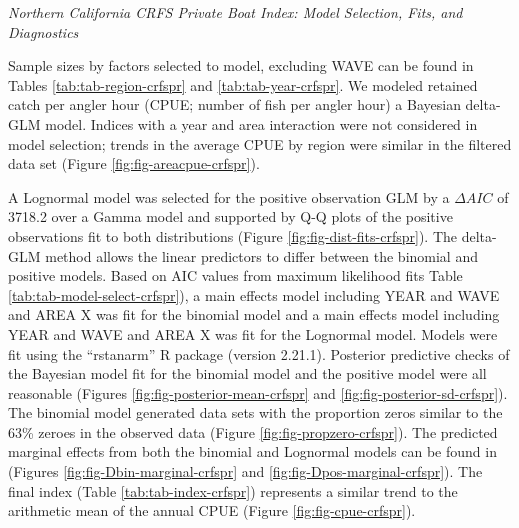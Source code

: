 \documentclass[
  english,
  a4paper,
]{article}
\begin{document}
\emph{Northern California CRFS Private Boat Index: Model Selection, Fits, and Diagnostics}

Sample sizes by factors selected to model, excluding WAVE can be found in Tables
\ref{tab:tab-region-crfspr} and \ref{tab:tab-year-crfspr}.
We modeled retained catch per angler hour (CPUE; number of fish per angler hour)
a Bayesian delta-GLM model. Indices with a year and area interaction were not
considered in model selection; trends in the average CPUE by region were similar
in the filtered data set (Figure \ref{fig:fig-areacpue-crfspr}).

A Lognormal model was
selected for the positive observation GLM by
a \(\Delta AIC\) of 3718.2 over a Gamma model and supported by Q-Q plots of the positive observations fit to both distributions (Figure \ref{fig:fig-dist-fits-crfspr}). The delta-GLM
method allows the linear predictors to differ between the binomial and positive models.
Based on AIC values from maximum likelihood fits Table \ref{tab:tab-model-select-crfspr}),
a main effects model including
YEAR and WAVE and AREA X
was fit for the binomial model and a main
effects model including
YEAR and WAVE and AREA X
was fit for the Lognormal model.
Models were fit using the ``rstanarm'' R package (version 2.21.1). Posterior predictive
checks of the Bayesian model fit for the binomial model and the positive model
were all reasonable (Figures \ref{fig:fig-posterior-mean-crfspr} and
\ref{fig:fig-posterior-sd-crfspr}). The binomial model generated data sets with the
proportion zeros similar to the 63\% zeroes in the observed data
(Figure \ref{fig:fig-propzero-crfspr}). The predicted marginal effects from
both the binomial and Lognormal models can be found in (Figures \ref{fig:fig-Dbin-marginal-crfspr} and \ref{fig:fig-Dpos-marginal-crfspr}). The
final index (Table \ref{tab:tab-index-crfspr})
represents a similar trend to the arithmetic mean of the annual CPUE (Figure \ref{fig:fig-cpue-crfspr}).

\newpage
\end{document}
